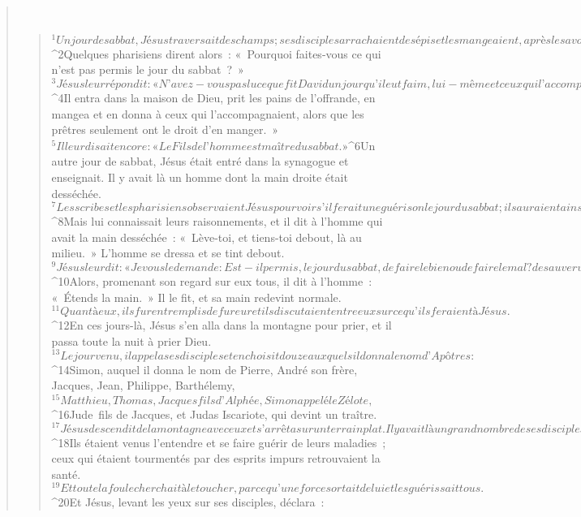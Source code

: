 \begin{verse}
         
      \bchapter{}
      \begin{verse}
${}^{1}Un jour de sabbat, Jésus traversait des champs ; ses disciples arrachaient des épis et les mangeaient, après les avoir froissés dans leurs mains. 
${}^{2}Quelques pharisiens dirent alors : « Pourquoi faites-vous ce qui n’est pas permis le jour du sabbat ? » 
${}^{3}Jésus leur répondit : « N’avez-vous pas lu ce que fit David un jour qu’il eut faim, lui-même et ceux qui l’accompagnaient ? 
${}^{4}Il entra dans la maison de Dieu, prit les pains de l’offrande, en mangea et en donna à ceux qui l’accompagnaient, alors que les prêtres seulement ont le droit d’en manger. » 
${}^{5}Il leur disait encore : « Le Fils de l’homme est maître du sabbat. »
${}^{6}Un autre jour de sabbat, Jésus était entré dans la synagogue et enseignait. Il y avait là un homme dont la main droite était desséchée. 
${}^{7}Les scribes et les pharisiens observaient Jésus pour voir s’il ferait une guérison le jour du sabbat ; ils auraient ainsi un motif pour l’accuser. 
${}^{8}Mais lui connaissait leurs raisonnements, et il dit à l’homme qui avait la main desséchée : « Lève-toi, et tiens-toi debout, là au milieu. » L’homme se dressa et se tint debout. 
${}^{9}Jésus leur dit : « Je vous le demande : Est-il permis, le jour du sabbat, de faire le bien ou de faire le mal ? de sauver une vie ou de la perdre ? » 
${}^{10}Alors, promenant son regard sur eux tous, il dit à l’homme : « Étends la main. » Il le fit, et sa main redevint normale. 
${}^{11}Quant à eux, ils furent remplis de fureur et ils discutaient entre eux sur ce qu’ils feraient à Jésus.
${}^{12}En ces jours-là, Jésus s’en alla dans la montagne pour prier, et il passa toute la nuit à prier Dieu. 
${}^{13}Le jour venu, il appela ses disciples et en choisit douze auxquels il donna le nom d’Apôtres : 
${}^{14}Simon, auquel il donna le nom de Pierre, André son frère, Jacques, Jean, Philippe, Barthélemy, 
${}^{15}Matthieu, Thomas, Jacques fils d’Alphée, Simon appelé le Zélote, 
${}^{16}Jude fils de Jacques, et Judas Iscariote, qui devint un traître.
${}^{17}Jésus descendit de la montagne avec eux et s’arrêta sur un terrain plat. Il y avait là un grand nombre de ses disciples et une grande multitude de gens venus de toute la Judée, de Jérusalem, et du littoral de Tyr et de Sidon. 
${}^{18}Ils étaient venus l’entendre et se faire guérir de leurs maladies ; ceux qui étaient tourmentés par des esprits impurs retrouvaient la santé. 
${}^{19}Et toute la foule cherchait à le toucher, parce qu’une force sortait de lui et les guérissait tous.
        ${}^{20}Et Jésus, levant les yeux sur ses disciples, déclara :

\end{verse}
\end{verse}
